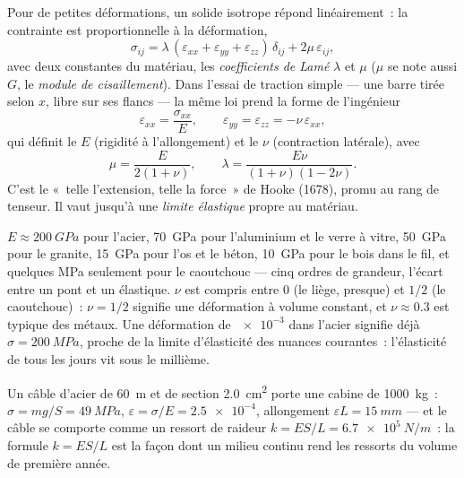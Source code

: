 \begin{theorem}\label{thm:b3:continuum-elasticity:hooke}
Pour de petites déformations, un solide isotrope répond linéairement~:
la contrainte est proportionnelle à la déformation,
\[
\sigma_{ij} = \lambda\,(\varepsilon_{xx} + \varepsilon_{yy} +
\varepsilon_{zz})\,\delta_{ij} + 2\mu\,\varepsilon_{ij} ,
\]
avec deux constantes du matériau, les \emph{coefficients de Lamé}
$\lambda$ et $\mu$ ($\mu$ se note aussi $G$, le \emph{module de
cisaillement}). Dans l'essai de traction simple --- une barre tirée
selon $x$, libre sur ses flancs --- la même loi prend la forme de
l'ingénieur
\[
\varepsilon_{xx} = \frac{\sigma_{xx}}{E} , \qquad
\varepsilon_{yy} = \varepsilon_{zz} = -\nu\,\varepsilon_{xx} ,
\]
qui définit le \emph{} $E$ (rigidité à l'allongement) et
le \emph{} $\nu$ (contraction latérale), avec
\[
\mu = \frac{E}{2(1 + \nu)} , \qquad
\lambda = \frac{E\nu}{(1 + \nu)(1 - 2\nu)} .
\]
C'est le «~telle l'extension, telle la force~» de Hooke (1678), promu
au rang de tenseur. Il vaut jusqu'à une \emph{limite élastique} propre
au matériau.
\end{theorem}
\admitted

\begin{remark}\label{rem:b3:continuum-elasticity:orders}
$E \approx \qty{200}{GPa}$ pour l'acier, \qty{70}{GPa} pour
l'aluminium et le verre à vitre, \qty{50}{GPa} pour le granite,
\qty{15}{GPa} pour l'os et le béton, \qty{10}{GPa} pour le bois dans
le fil, et quelques MPa seulement pour le caoutchouc --- cinq ordres de
grandeur, l'écart entre un pont et un élastique. $\nu$ est compris
entre $0$ (le liège, presque) et $1/2$ (le caoutchouc)~: $\nu = 1/2$
signifie une déformation à volume constant, et $\nu \approx 0.3$ est
typique des métaux. Une déformation de $\num{e-3}$ dans l'acier
signifie déjà $\sigma = \qty{200}{MPa}$, proche de la limite d'élasticité
des nuances courantes~: l'élasticité de tous les jours vit sous le
millième.
\end{remark}

\begin{example}\label{ex:b3:continuum-elasticity:cable}
Un câble d'acier de \qty{60}{m} et de section \qty{2.0}{cm^2} porte une
cabine de \qty{1000}{kg}~: $\sigma = mg/S = \qty{49}{MPa}$, $\varepsilon =
\sigma/E = \num{2.5e-4}$, allongement $\varepsilon L = \qty{15}{mm}$ ---
et le câble se comporte comme un ressort de raideur $k = ES/L =
\qty{6.7e5}{N/m}$~: la formule $k = ES/L$ est la façon dont un milieu
continu rend les ressorts du volume de première année.
\end{example}

